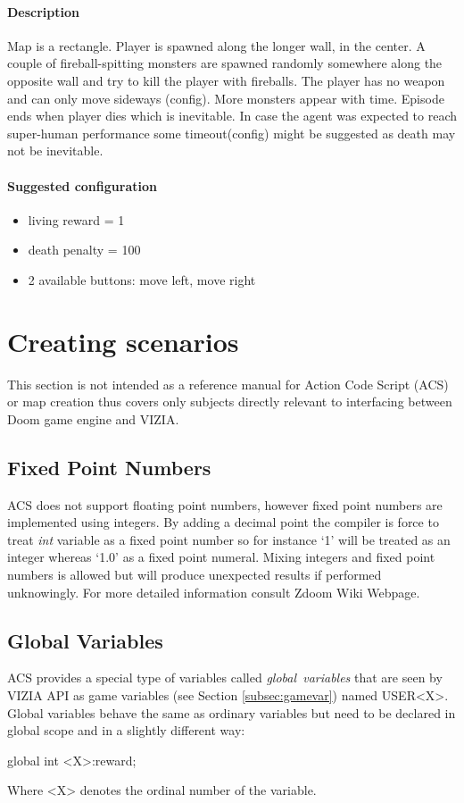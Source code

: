 		\paragraph{Description}
			Map is a rectangle. Player is spawned along the longer wall, in the center. A couple of fireball-spitting monsters are spawned randomly somewhere along the opposite wall and try to kill the player with fireballs. The player has no weapon and can only move sideways (config). More monsters appear with time. Episode ends when player dies which is inevitable. In case the agent was expected to reach super-human performance some timeout(config) might be suggested as death may not be inevitable.

		\paragraph{Suggested configuration}
		\begin{itemize}
			\item living reward = 1
			\item death penalty = 100
			\item 2 available buttons: move left, move right
		\end{itemize}
	\newpage

\section{Creating scenarios}\label{sec:creating_scenarios}
	This section is not intended as a reference manual for Action Code Script (ACS) or map creation thus covers only subjects directly relevant to interfacing between Doom game engine and VIZIA.


	\subsection{Fixed Point Numbers}\label{subsec:fixed_point}
		ACS does not support floating point numbers, however fixed point numbers are implemented using integers. By adding a decimal point the compiler is force to treat \emph{int} variable as a fixed point number so for instance `1' will be treated as an integer whereas `1.0' as a fixed point numeral. Mixing integers and fixed point numbers is allowed but will produce unexpected results if performed unknowingly. For more detailed information consult Zdoom Wiki Webpage\cite{zdoom-wiki}.

	\subsection{Global Variables}\label{subsec:global_variable}
		ACS provides a special type of variables called \emph{global~variables} that are seen by VIZIA API as game variables (see Section \ref{subsec:gamevar}) named USER<X>. Global variables behave the same as ordinary variables but need to be declared in global scope and in a slightly different way:
		\begin{clinee}
global int <X>:reward;
		\end{clinee}
		Where <X> denotes the ordinal number of the variable.
		
